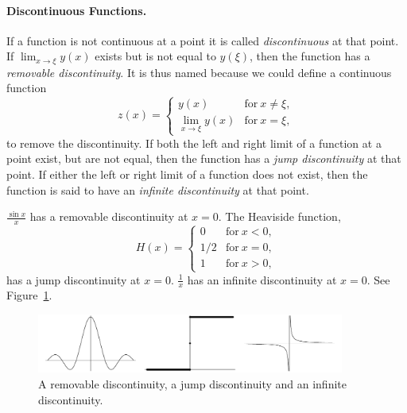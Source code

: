\paragraph{Discontinuous Functions.}
If a function is not continuous at a point it is called \textit{discontinuous}
at that point.  If $\lim_{x \to \xi} y(x)$ exists but is not equal to 
$y(\xi)$, then the function has a \textit{removable discontinuity}.  It 
is thus named because we could define a continuous function
\[
z(x) = 
\begin{cases}
  y(x) & \mathrm{for}\ x \neq \xi, \\
  \lim_{x \to \xi} y(x) & \mathrm{for}\ x = \xi,
\end{cases}
\]
to remove the discontinuity.  If both the left and right limit of a function
at a point exist, but are not equal, then the function has a 
\textit{jump discontinuity} at that point.  If either the left or right
limit of a function does not exist, then the function is said to have an
\textit{infinite discontinuity} at that point.




\begin{Example}
  $\frac{\sin x}{x}$ has a removable discontinuity at $x=0$.  
  The Heaviside function,
  \[
  H(x) = 
  \begin{cases}
    0 & \mathrm{for}\ x < 0, \\
    1/2 & \mathrm{for}\ x = 0, \\
    1 & \mathrm{for}\ x > 0,
  \end{cases}
  \]
  has a jump discontinuity at $x = 0$.  $\frac{1}{x}$ has an infinite
  discontinuity at $x = 0$.  See Figure~\ref{discont}.
  \begin{figure}[h!]
    \begin{center}
      \includegraphics[width=0.9\textwidth]{calculus/differential/discont}
    \end{center}
    \caption{A removable discontinuity, a jump discontinuity and an 
      infinite discontinuity.}
    \label{discont}
  \end{figure}
\end{Example}





